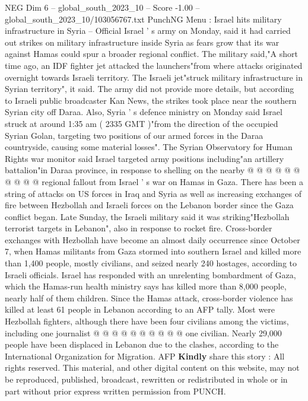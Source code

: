 \begin{textsample}{NEG Dim 6 – global\_south\_2023\_10 – Score -1.00 – global\_south\_2023\_10/103056767.txt}  \label{ex:f6_neg_210}
PunchNG Menu : Israel hits military infrastructure in Syria -- Official Israel ' s army on Monday, said it had carried out strikes on military infrastructure inside Syria as fears grow that its war against Hamas could spur a broader regional conflict.
The military said,"A short time ago, an IDF fighter jet attacked the launchers"from where attacks originated overnight towards Israeli territory.
The Israeli jet"struck military infrastructure in Syrian territory", it said.
The army did not provide more details, but according to Israeli public broadcaster Kan News, the strikes took place near the southern Syrian city off Daraa.
Also, Syria ' s defence ministry on Monday said Israel struck at around 1:35 am ( 2335 GMT )"from the direction of the occupied Syrian Golan, targeting two positions of our armed forces in the Daraa countryside, causing some material losses".
The Syrian Observatory for Human Rights war monitor said Israel targeted army positions including"an artillery battalion"in Daraa province, in response to shelling on the nearby @ @ @ @ @ @ @ @ @ @ regional fallout from Israel ' s war on Hamas in Gaza.
There has been a string of attacks on US forces in Iraq and Syria as well as increasing exchanges of fire between Hezbollah and Israeli forces on the Lebanon border since the Gaza conflict began.
Late Sunday, the Israeli military said it was striking"Hezbollah terrorist targets in Lebanon", also in response to rocket fire.
Cross-border exchanges with Hezbollah have become an almost daily occurrence since October 7, when Hamas militants from Gaza stormed into southern Israel and killed more than 1,400 people, mostly civilians, and seized nearly 240 hostages, according to Israeli officials.
Israel has responded with an unrelenting bombardment of Gaza, which the Hamas-run health ministry says has killed more than 8,000 people, nearly half of them children.
Since the Hamas attack, cross-border violence has killed at least 61 people in Lebanon according to an AFP tally.
Most were Hezbollah fighters, although there have been four civilians among the victims, including one journalist @ @ @ @ @ @ @ @ @ @ one civilian.
Nearly 29,000 people have been displaced in Lebanon due to the clashes, according to the International Organization for Migration.
AFP \textbf{Kindly} share this story : All rights reserved.
This material, and other digital content on this website, may not be reproduced, published, broadcast, rewritten or redistributed in whole or in part without prior express written permission from PUNCH.

\end{textsample}
